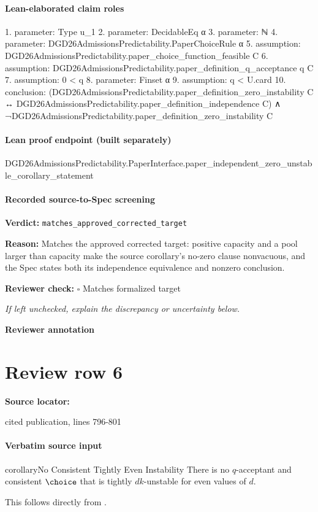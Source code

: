 \documentclass[10pt]{article}
\newcommand{\reviewerbox}{%
  \par\noindent\fbox{\parbox{0.96\linewidth}{\rule{0pt}{0.38in}}}\par
}
\newcommand{\reviewmatch}[1]{%
  \par\noindent\textbf{Reviewer check:} $\square$\; #1\par
  \noindent\emph{If left unchecked, explain the discrepancy or uncertainty below.}\par
}
\begin{document}
\paragraph{Lean-elaborated claim roles}\begin{ReviewVerbatim}
1. parameter: Type u_1
2. parameter: DecidableEq α
3. parameter: ℕ
4. parameter: DGD26AdmissionsPredictability.PaperChoiceRule α
5. assumption: DGD26AdmissionsPredictability.paper_choice_function_feasible C
6. assumption: DGD26AdmissionsPredictability.paper_definition_q_acceptance q C
7. assumption: 0 < q
8. parameter: Finset α
9. assumption: q < U.card
10. conclusion: (DGD26AdmissionsPredictability.paper_definition_zero_instability C ↔
    DGD26AdmissionsPredictability.paper_definition_independence C) ∧
  ¬DGD26AdmissionsPredictability.paper_definition_zero_instability C
\end{ReviewVerbatim}

\paragraph{Lean proof endpoint (built separately)}\begin{ReviewVerbatim}
DGD26AdmissionsPredictability.PaperInterface.paper_independent_zero_unstable_corollary_statement
\end{ReviewVerbatim}

\paragraph{Recorded source-to-Spec screening}
\textbf{Verdict:} \texttt{matches\_approved\_corrected\_target}
\\
{\raggedright
\textbf{Reason:} Matches the approved corrected target:\allowbreak{} positive capacity and a pool larger than capacity make the source corollary's no-\allowbreak{}zero clause nonvacuous, and the Spec states both its independence equivalence and nonzero conclusion.\allowbreak{}
\par}
\reviewmatch{Matches formalized target}
\noindent\textbf{Reviewer annotation}\par
\reviewerbox
\clearpage
\hypertarget{source-claim-18a641b7c4365d27}{}
\section*{Review row 6}
\textbf{Source locator:} {\footnotesize\raggedright cited publication, lines 796-\allowbreak{}801\par}
\paragraph{Verbatim source input}
\begin{ReviewVerbatim}
\begin{restatable}{corollary}{No Consistent Tightly Even Instability}
\label{cor:even-inconsistency}
There is no $q$-acceptant and consistent $\choice$ that is tightly $dk$-unstable for even values of $d$.
\end{restatable}

This follows directly from .
\end{ReviewVerbatim}
\end{document}
